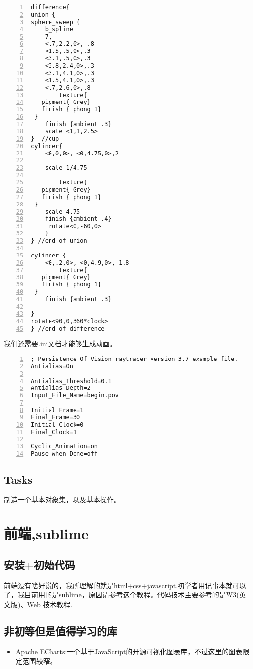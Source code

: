 \documentclass[11pt]{amsart}
\begin{document}
\begin{lstlisting}[numbers=left,numberstyle=\tiny,numbersep=10pt]
 difference{
union { 
sphere_sweep { 
    b_spline
    7,      
    <.7,2.2,0>, .8
    <1.5,.5,0>,.3
    <3.1,.5,0>,.3 
    <3.8,2.4,0>,.3   
    <3.1,4.1,0>,.3  
    <1.5,4.1,0>,.3
    <.7,2.6,0>,.8
        texture{
   pigment{ Grey}
   finish { phong 1}
 }
    finish {ambient .3}  
    scale <1,1,2.5>
}  //cup
cylinder{
    <0,0,0>, <0,4.75,0>,2
    
    scale 1/4.75
    
        texture{
   pigment{ Grey}
   finish { phong 1}
 } 
    scale 4.75
    finish {ambient .4}
     rotate<0,-60,0>
    }
} //end of union   

cylinder {
    <0,.2,0>, <0,4.9,0>, 1.8
        texture{
   pigment{ Grey}
   finish { phong 1}
 }
    finish {ambient .3}    
    
}
rotate<90,0,360*clock>
} //end of difference
\end{lstlisting}
我们还需要.ini文档才能够生成动画。
\begin{lstlisting}[numbers=left,numberstyle=\tiny,numbersep=10pt]
; Persistence Of Vision raytracer version 3.7 example file.
Antialias=On

Antialias_Threshold=0.1
Antialias_Depth=2
Input_File_Name=begin.pov

Initial_Frame=1
Final_Frame=30
Initial_Clock=0
Final_Clock=1

Cyclic_Animation=on
Pause_when_Done=off
\end{lstlisting}
\subsection{Tasks}
制造一个基本对象集，以及基本操作。
\section{前端,sublime}
\subsection{安装+初始代码}
前端没有啥好说的，我所理解的就是html+css+javascript.初学者用记事本就可以了，我目前用的是sublime，原因请参考\href{https://www.bilibili.com/video/BV1vx411z7rb}{这个教程}。代码技术主要参考的是\href{https://www.quanzhanketang.com/}{W3(英文版)}、\href{http://www.w3school.com.cn/}{Web 技术教程}.
\subsection{非初等但是值得学习的库}
\begin{itemize}
\item \href{https://echarts.apache.org/zh/index.html}{Apache ECharts}:一个基于JavaScript的开源可视化图表库，不过这里的图表限定范围较窄。
\end{itemize}
\end{document}
